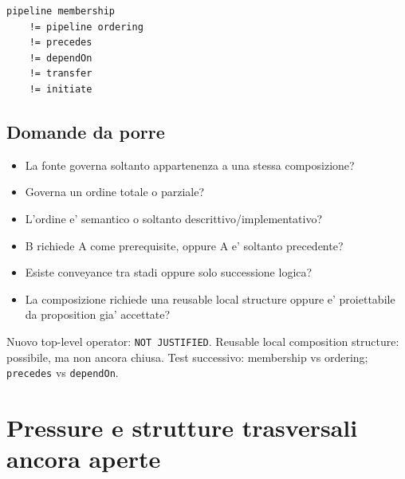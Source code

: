 \documentclass[11pt,a4paper]{article}
\begin{document}
\begin{lstlisting}
pipeline membership
    != pipeline ordering
    != precedes
    != dependOn
    != transfer
    != initiate
\end{lstlisting}

\subsection{Domande da porre}
\begin{itemize}
  \item La fonte governa soltanto appartenenza a una stessa composizione?
  \item Governa un ordine totale o parziale?
  \item L'ordine e' semantico o soltanto descrittivo/implementativo?
  \item B richiede A come prerequisite, oppure A e' soltanto precedente?
  \item Esiste conveyance tra stadi oppure solo successione logica?
  \item La composizione richiede una reusable local structure oppure e' proiettabile da proposition gia' accettate?
\end{itemize}

\begin{ddtaopen}[title={Current disposition}]
Nuovo top-level operator: \texttt{NOT JUSTIFIED}. Reusable local composition structure: possibile, ma non ancora chiusa. Test successivo: membership vs ordering; \texttt{precedes} vs \texttt{dependOn}.
\end{ddtaopen}

\section{Pressure e strutture trasversali ancora aperte}
\end{document}
